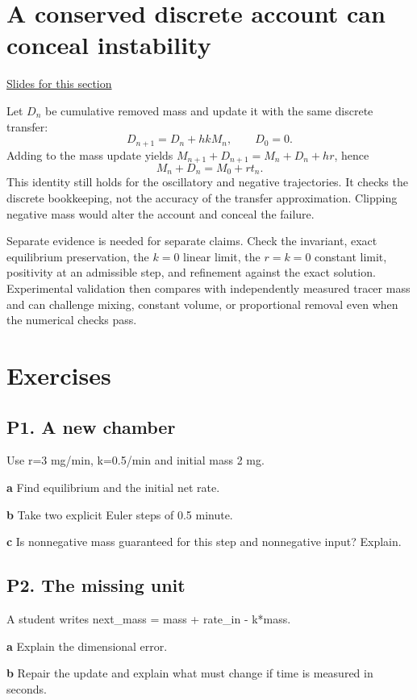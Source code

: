 \documentclass[11pt,letterpaper]{article}
\theoremstyle{definition}\newtheorem{definition}{Definition}\newtheorem{example}{Example}
\numberwithin{equation}{section}
\begin{document}
\section{A conserved discrete account can conceal instability}
\hypertarget{note-a-conserved-discrete-account-can-conceal-instability}{}\label{note:a-conserved-discrete-account-can-conceal-instability}
{\small \href{slides.html\#frame=discrete-mass-budget\&step=1}{Slides for this section}}\par
Let $D_n$ be cumulative removed mass and update it with the same discrete transfer:
\[
D_{n+1}=D_n+hkM_n,\qquad D_0=0.
\]
Adding to the mass update yields $M_{n+1}+D_{n+1}=M_n+D_n+hr$, hence
\[
\boxed{M_n+D_n=M_0+rt_n.}
\]
This identity still holds for the oscillatory and negative trajectories. It checks the discrete bookkeeping, not the accuracy of the transfer approximation. Clipping negative mass would alter the account and conceal the failure.

Separate evidence is needed for separate claims. Check the invariant, exact equilibrium preservation, the $k=0$ linear limit, the $r=k=0$ constant limit, positivity at an admissible step, and refinement against the exact solution. Experimental validation then compares with independently measured tracer mass and can challenge mixing, constant volume, or proportional removal even when the numerical checks pass.
\bigskip
\section*{Exercises}
\par\noindent\begin{minipage}{\linewidth}
\subsection*{P1. A new chamber}
Use r=\allowbreak{}3 mg/min, k=\allowbreak{}0.5/min and initial mass 2 mg.

\textbf{a} Find equilibrium and the initial net rate.

\end{minipage}\par\medskip
\textbf{b} Take two explicit Euler steps of 0.5 minute.

\textbf{c} Is nonnegative mass guaranteed for this step and nonnegative input? Explain.

\par\noindent\begin{minipage}{\linewidth}
\subsection*{P2. The missing unit}
A student writes next\_mass =\allowbreak{} mass +\allowbreak{} rate\_in - k*mass.

\textbf{a} Explain the dimensional error.

\end{minipage}\par\medskip
\textbf{b} Repair the update and explain what must change if time is measured in seconds.
\end{document}
